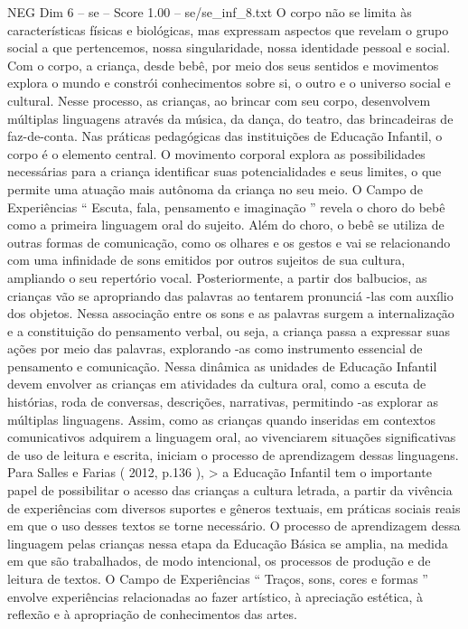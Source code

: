 \begin{textsample}{NEG Dim 6 – se – Score 1.00 – se/se\_inf\_8.txt}
O corpo não se limita às características físicas e biológicas, mas expressam aspectos que revelam o grupo social a que pertencemos, nossa singularidade, nossa identidade pessoal e social.
Com o corpo, a criança, desde bebê, por meio dos seus sentidos e movimentos explora o mundo e constrói conhecimentos sobre si, o outro e o universo social e cultural.
Nesse processo, as crianças, ao brincar com seu corpo, desenvolvem múltiplas linguagens através da música, da dança, do teatro, das brincadeiras de faz-de-conta.
Nas práticas pedagógicas das instituições de Educação Infantil, o corpo é o elemento central.
O movimento corporal explora as possibilidades necessárias para a criança identificar suas potencialidades e seus limites, o que permite uma atuação mais autônoma da criança no seu meio.
O Campo de Experiências “ Escuta, fala, pensamento e imaginação ” revela o choro do bebê como a primeira linguagem oral do sujeito.
Além do choro, o bebê se utiliza de outras formas de comunicação, como os olhares e os gestos e vai se relacionando com uma infinidade de sons emitidos por outros sujeitos de sua cultura, ampliando o seu repertório vocal.
Posteriormente, a partir dos balbucios, as crianças vão se apropriando das palavras ao tentarem pronunciá -las com auxílio dos objetos.
Nessa associação entre os sons e as palavras surgem a internalização e a constituição do pensamento verbal, ou seja, a criança passa a expressar suas ações por meio das palavras, explorando -as como instrumento essencial de pensamento e comunicação.
Nessa dinâmica as unidades de Educação Infantil devem envolver as crianças em atividades da cultura oral, como a escuta de histórias, roda de conversas, descrições, narrativas, permitindo -as explorar as múltiplas linguagens.
Assim, como as crianças quando inseridas em contextos comunicativos adquirem a linguagem oral, ao vivenciarem situações significativas de uso de leitura e escrita, iniciam o processo de aprendizagem dessas linguagens.
Para Salles e Farias ( 2012, p.136 ), > a Educação Infantil tem o importante papel de possibilitar o acesso das crianças a cultura letrada, a partir da vivência de experiências com diversos suportes e gêneros textuais, em práticas sociais reais em que o uso desses textos se torne necessário.
O processo de aprendizagem dessa linguagem pelas crianças nessa etapa da Educação Básica se amplia, na medida em que são trabalhados, de modo intencional, os processos de produção e de leitura de textos.
O Campo de Experiências “ Traços, sons, cores e formas ” envolve experiências relacionadas ao fazer artístico, à apreciação estética, à reflexão e à apropriação de conhecimentos das artes.

\end{textsample}
